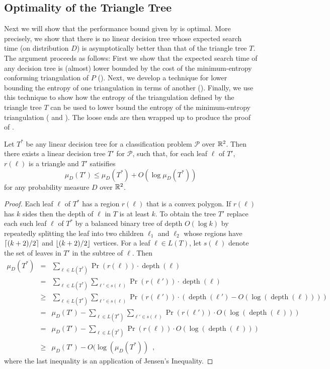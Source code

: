 \documentclass[charterfonts,lotsofwhite]{patmorin}
\DeclareMathOperator{\depth}{depth}
\begin{document}
\subsection{Optimality of the Triangle Tree}

Next we will show that the performance bound given by
 is optimal.  More precisely, we show that there
is no linear decision tree whose expected search time (on distribution
$D$) is asymptotically better than that of the triangle tree $T$.  The
argument proceeds as follows:  First we show that the expected search
time of any decision tree is (almost) lower bounded by the cost of the
minimum-entropy conforming triangulation of $P$
().  Next, we develop a technique for lower
bounding the entropy of one triangulation in terms of another
().  Finally, we use this technique to show how the
entropy of the triangulation defined by the triangle tree $T$ can be
used to lower bound the entropy of the minimum-entropy triangulation
( and ). The loose ends are then
wrapped up to produce the proof of .

\begin{lem}
Let $T^*$ be any linear decision tree for a classification problem
$\mathcal{P}$ over $\mathbb{R}^2$.  Then there exists a linear decision tree
$T'$ for $\mathcal{P}$, such that, for each leaf $\ell$ of $T'$,
$r(\ell)$ is a triangle and $T'$ satisifies
\[
    \mu_D(T') \le \mu_D(T^*) + O(\log\mu_D(T^*))
\]
for any probability measure $D$ over $\mathbb{R}^2$.
\end{lem}

\begin{proof}
Each leaf $\ell$ of $T^*$ has a region $r(\ell)$ that is a convex
polygon.  If $r(\ell)$ has $k$ sides then the depth of $\ell$ in $T$
is at least $k$.  To obtain the tree $T'$ replace each such leaf
$\ell$ of $T^*$ by a balanced binary tree of depth $O(\log k)$ by
repeatedly splitting the leaf into two children $\ell_1$ and $\ell_2$
whose regions have $\left\lceil (k+2)/2 \right\rceil$ and $\left\lfloor (k+2)/2 \right\rfloor$ vertices.
For a leaf $\ell\in L(T)$, let $s(\ell)$ denote the set of leaves in $T'$
in the subtree of $\ell$.   Then
\begin{eqnarray*}
   \mu_D(T^*) 
     &  =  & \sum_{\ell\in L(T^*)} \Pr(r(\ell))\cdot \depth(\ell) \\
     &  =  & \sum_{\ell\in L(T^*)}\sum_{\ell'\in s(\ell)} 
              \Pr(r(\ell'))\cdot \depth(\ell) \\
     & \ge & \sum_{\ell\in L(T^*)} 
             \sum_{\ell'\in s(\ell)}\Pr(r(\ell'))\cdot (\depth(\ell')
                   - O(\log (\depth(\ell)))) \\
     &  =  & \mu_D(T') - \sum_{\ell\in L(T^*)} 
             \sum_{\ell'\in s(\ell)}\Pr(r(\ell'))\cdot O(\log (\depth(\ell))) \\
     &  =  & \mu_D(T') - \sum_{\ell\in L(T^*)} 
             \Pr(r(\ell))\cdot O(\log (\depth(\ell))) \\
     & \ge & \mu_D(T') - O(\log(\mu_D(T^*)) \enspace , 
\end{eqnarray*}
where the last inequality is an application of Jensen's Inequality.
\end{proof}
\end{document}
